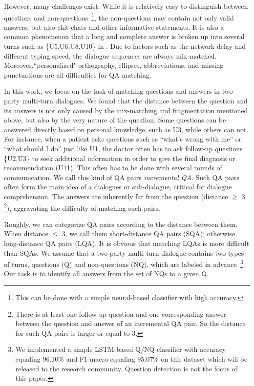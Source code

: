 However, many challenges exist. While it is relatively easy to distinguish
between questions and non-questions~\footnote{This can be done with a simple 
neural-based classifier with high accuracy.},
the non-questions may contain not only valid answers, but also chit-chats and
other informative statements. It is also a common phenomenon that a long and complete answer is broken up into several turns such as \{U5,U6,U8,U10\} in . Due to factors such as the network delay and different typing speed, the dialogue sequences are always mix-matched. Moreover,``personalized" orthography, ellipses, abbreviations, and missing punctuations are all difficulties for QA matching.



In this work, we focus on the task of matching questions and answers in two-party 
multi-turn dialogues. We found that the distance between the question and its answers 
is not only caused by the mix-matching and fragmentation mentioned above, 
but also by the very nature of the question. 
Some questions can be answered directly based on personal knowledge, 
such as U3, while others can not. For instance, when a patient asks questions 
such as ``what's wrong with me'' or ``what should I do'' just like U1, the doctor often has to ask follow-up questions \{U2,U3\} to seek additional information in order to give the final diagnosis or recommendation (U11). This often has to be done with several rounds of communication. 
We call this kind of QA pairs {\em incremental QA}. 
Such QA pairs often form the main idea of a dialogues or sub-dialogue, 
critical for dialogue comprehension. The answers are inherently far from the question (distance $\geq$ 3 \footnote{There is at least one follow-up question and one corresponding answer between the question and answer of an incremental QA pair. So the distance for such QA pairs is larger or equal to 3.}), aggravating the difficulty of matching such pairs. 

Roughly, we can categorize QA pairs according to the distance between them. 
When distance $\leq$ 3, we call them short-distance QA pairs (SQA); 
otherwise, long-distance QA pairs (LQA). 
It is obvious that matching LQAs is more difficult than SQAs. 
We assume that a two-party multi-turn dialogue contains two types of turns, 
questions (Q) and non-questions (NQ), 
which are labeled in advance~\footnote{We implemented a simple LSTM-based Q/NQ classifier
with accuracy equaling 96.10\% and F1-macro equaling 95.07\% on this dataset
which will be released to the research community.
Question detection is not the focus of this paper.}. 
Our task is to identify all answers from the set of NQs to a given Q. 

